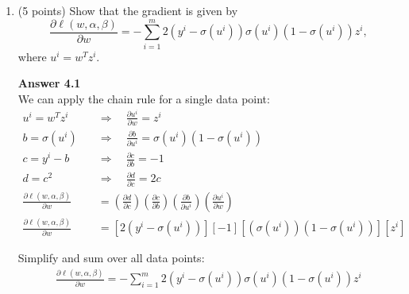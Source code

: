 \documentclass[twoside,10pt]{article}
\begin{document}
\begin{enumerate}
\item (5 points) Show that the gradient is given by
\[
\frac{\partial \ell(w, \alpha, \beta) }{\partial w}
= - \sum_{i=1}^m 2(y^i - \sigma(u^i))\sigma(u^i)(1-\sigma(u^i)) z^i,
\]
where $u^i = w^T z^i$. 

{\bf Answer 4.1}\\
We can apply the chain rule for a single data point:
\begin{align*}
    u^i = w^Tz^i \quad &\Rightarrow \quad \frac{\partial u^i}{\partial w} = z^i \\
    b = \sigma(u^i) \quad &\Rightarrow \quad \frac{\partial b}{\partial u^i} = \sigma(u^i)(1-\sigma(u^i)) \\
    c = y^i-b \quad &\Rightarrow \quad \frac{\partial c}{\partial b} = -1 \\
    d = c^2 \quad &\Rightarrow \quad \frac{\partial d}{\partial c} = 2c \\
    \frac{\partial \ell(w, \alpha, \beta) }{\partial w} &= (\frac{\partial d}{\partial c})(\frac{\partial c}{\partial b})(\frac{\partial b}{\partial u^i})(\frac{\partial u^i}{\partial w})\\
    \frac{\partial \ell(w, \alpha, \beta) }{\partial w} &= [2(y^i-\sigma(u^i))][-1][(\sigma(u^i))(1-\sigma(u^i))][z^i]
\end{align*}

Simplify and sum over all data points:
\begin{align*}
    \frac{\partial \ell(w, \alpha, \beta) }{\partial w} = - \sum_{i=1}^m 2(y^i - \sigma(u^i))\sigma(u^i)(1-\sigma(u^i)) z^i
\end{align*}



\end{enumerate}
\end{document}
